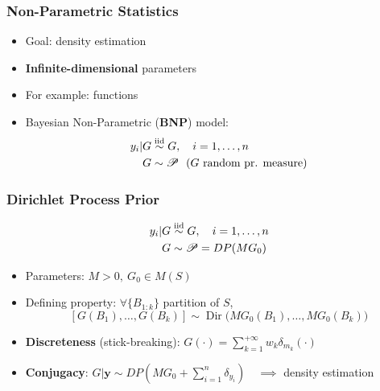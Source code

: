 

\begin{frame}
	\frametitle{Non-Parametric Statistics}
	\begin{itemize}
		\item Goal: density estimation
		\item \textbf{Infinite-dimensional} parameters
		\item For example: functions
		\item Bayesian Non-Parametric (\textbf{BNP}) model:
		\begin{align*}
			y_i | G &\iidsim G, \quad i=1,\dots,n \\
			G &\sim \mathscr P \ \ \text{($G$ random pr. measure)} %
		\end{align*}
	\end{itemize}
\end{frame}

\begin{frame}
	\frametitle{Dirichlet Process Prior}
	\begin{align*}
		y_i | G &\stackrel{\text{iid}}{\sim} G, \quad i=1,\dots,n \\
		G &\sim \mathscr P = DP(M G_0)
	\end{align*}
	\vspace{-10pt}
	\begin{itemize}
		\item Parameters: $M > 0, \ G_0 \in M(S)$
		\vspace{5pt}
		\item Defining property: $\forall \{B_{1:k}\}$ partition of $S$,
		$$[G(B_1),\dots,G(B_k)] \sim \operatorname{Dir}
			\big( M G_0(B_1),\dots, M G_0(B_k) \big)$$
		\vspace{-15pt}
		\item \textbf{Discreteness} (stick-breaking): $G(\cdot) = \sum_{k=1}^{+\infty} w_k \delta_{m_k} (\cdot)$
		\vspace{10pt}
		\item \textbf{Conjugacy}: $G | \mathbf{y} \sim DP(M G_0 + \sum_{i=1}^n \delta_{y_i}) \quad \implies$ density estimation
	\end{itemize}
\end{frame}


